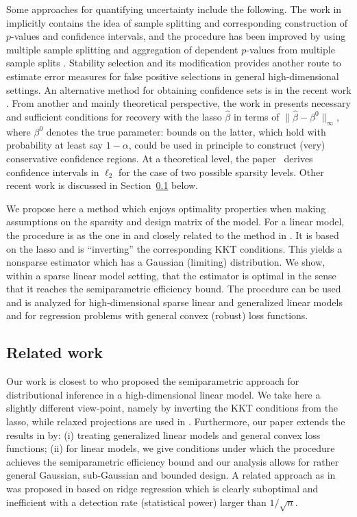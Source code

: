 \documentclass[aos,MSNbibl,dvips]{arximspdf}
\begin{document}
Some approaches for quantifying uncertainty include the following. The
work in
\cite{WR08} implicitly contains the idea of sample splitting and corresponding
construction of $p$-values and confidence intervals, and the procedure
has been
improved by using multiple sample splitting and aggregation of dependent
$p$-values from multiple sample splits
\cite{memepb09}. Stability selection \cite{mebu10} and its modification
\cite{shah13} provides another route to estimate error measures for false
positive selections in general high-dimensional settings.
An alternative method for obtaining confidence sets is in the recent
work \cite{Meinshausen2013}.
From another and
mainly theoretical perspective, the work in \cite{judetal11}
presents necessary and sufficient conditions for recovery with the lasso
$\hat{\beta}$ in terms of $\|\hat{\beta} - \beta^0\|_{\infty}$, where
$\beta^0$ denotes the true parameter: bounds on
the latter, which hold with
probability at least say $1- \alpha$, could be used in
principle to construct (very) conservative confidence regions.
At a theoretical level, the paper~\cite{Nickl2013}
derives confidence intervals in $\ell_2$ for the case of two possible
sparsity levels. Other recent
work is discussed in Section~\ref{subsecrelwork} below.

We propose here a method which enjoys optimality properties when
making assumptions on the sparsity and design matrix of the model. For a
linear model, the procedure is as the one in
\cite{zhangzhang11}
and closely related to the method in
\cite{jamo13}. It is based on the lasso and is ``inverting'' the
corresponding KKT conditions. This yields a nonsparse estimator which has
a Gaussian (limiting) distribution. We show, within a sparse linear model
setting, that the estimator is optimal in the sense that it reaches the
semiparametric efficiency bound. The procedure can be used and is
analyzed for
high-dimensional sparse linear and generalized linear models and for
regression problems with general convex (robust) loss functions.

\subsection{Related work}\label{subsecrelwork}

Our work is closest to \cite{zhangzhang11} who proposed the
semiparametric approach for distributional inference in a high-dimensional
linear model. We take here a slightly different view-point, namely by
inverting the KKT conditions from the lasso, while relaxed projections are
used in \cite{zhangzhang11}. Furthermore, our paper extends the
results in
\cite{zhangzhang11} by: (i) treating generalized linear models and general
convex loss functions; (ii) for linear models, we give conditions under
which the procedure achieves the semiparametric efficiency bound and our
analysis allows for rather general Gaussian, sub-Gaussian and bounded
design. A related approach as in \cite{zhangzhang11} was proposed in
\cite{pb12} based on ridge regression which is clearly suboptimal and
inefficient with a detection rate (statistical power) larger
than $1/ \sqrt n$.
\end{document}
